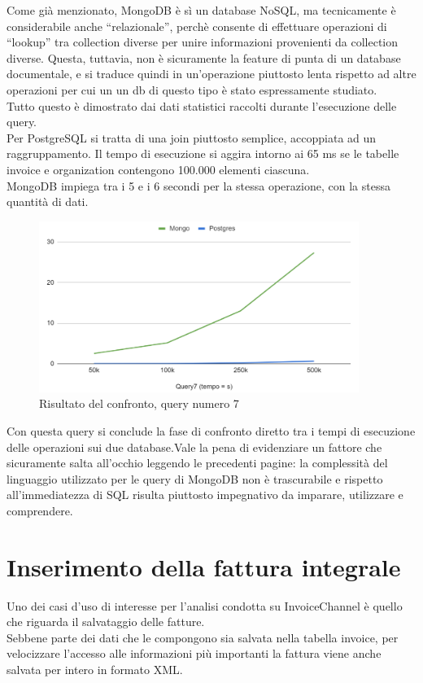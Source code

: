 \noindent Come già menzionato, MongoDB è sì un database NoSQL, ma tecnicamente è considerabile anche ``relazionale'', perchè consente di effettuare operazioni di ``lookup'' tra collection diverse per unire informazioni provenienti da collection diverse. Questa, tuttavia, non è sicuramente la feature di punta di un database documentale, e si traduce quindi in un'operazione piuttosto lenta rispetto ad altre operazioni per cui un un db di questo tipo è stato espressamente studiato.\\

\noindent Tutto questo è dimostrato dai dati statistici raccolti durante l'esecuzione delle query.\\
Per PostgreSQL si tratta di una join piuttosto semplice, accoppiata ad un raggruppamento. Il tempo di esecuzione si aggira intorno ai 65 ms se le tabelle invoice e organization contengono 100.000 elementi ciascuna.\\
MongoDB impiega tra i 5 e i 6 secondi per la stessa operazione, con la stessa quantità di dati.

\begin{figure}[htbp]
\begin{center}
\includegraphics[height=15em]{immagini/query/query7_results.png}
\caption{Risultato del confronto, query numero 7}
\end{center}
\end{figure}

\noindent Con questa query si conclude la fase di confronto diretto tra i tempi di esecuzione delle operazioni sui due database.Vale la pena di evidenziare un fattore che sicuramente salta all'occhio leggendo le precedenti pagine: la complessità del linguaggio utilizzato per le query di MongoDB non è trascurabile e rispetto all'immediatezza di SQL risulta piuttosto impegnativo da imparare, utilizzare e comprendere.

\section{Inserimento della fattura integrale}
\label{sec:fattura-integrale}
Uno dei casi d'uso di interesse per l'analisi condotta su InvoiceChannel è quello che riguarda il salvataggio delle fatture.\\
Sebbene parte dei dati che le compongono sia salvata nella tabella invoice, per velocizzare l'accesso alle informazioni più importanti la fattura viene anche salvata per intero in formato XML.\\

